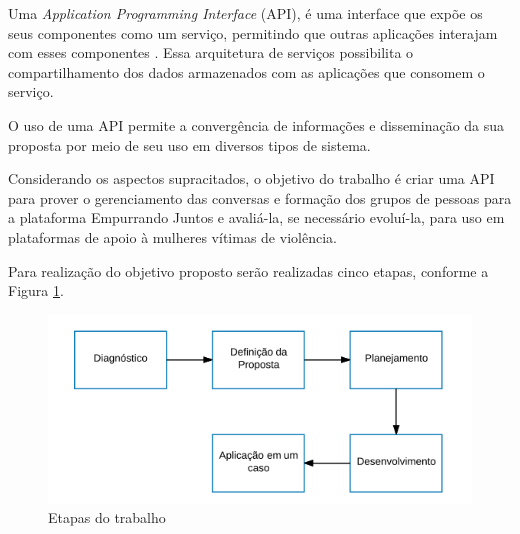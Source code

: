 
Uma \textit{Application Programming Interface} (API), é uma interface que expõe os seus componentes como um serviço, 
permitindo que outras aplicações interajam com esses componentes \cite{wagh2012comparative, understanding_web}. 
Essa arquitetura de serviços possibilita o compartilhamento dos dados armazenados com as aplicações que consomem o serviço. 

O uso de uma API permite a convergência de informações e disseminação da sua proposta por meio de seu uso em diversos tipos de sistema.





Considerando os aspectos supracitados, o objetivo do trabalho é criar uma API para prover o gerenciamento das conversas e formação
dos grupos de pessoas para a plataforma Empurrando Juntos e avaliá-la, se necessário evoluí-la, para uso 
em plataformas de apoio à mulheres vítimas de violência.



Para realização do objetivo proposto serão realizadas cinco etapas, conforme a Figura \ref{fig:etapas_trabalho}.

\begin{figure}[h!]
\centering
\includegraphics[scale=0.6]{figuras/etapas.png}
\caption{Etapas do trabalho}
\label{fig:etapas_trabalho}
\end{figure}

